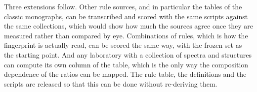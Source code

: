 Three extensions follow. Other rule sources, and in particular the tables of the classic monographs, can be transcribed and scored with the same scripts against the same collections, which would show how much the sources agree once they are measured rather than compared by eye. Combinations of rules, which is how the fingerprint is actually read, can be scored the same way, with the frozen set as the starting point. And any laboratory with a collection of spectra and structures can compute its own column of the table, which is the only way the composition dependence of the ratios can be mapped. The rule table, the definitions and the scripts are released so that this can be done without re-deriving them.
